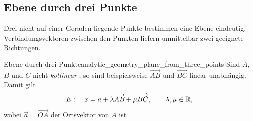 \subsection{Ebene durch drei Punkte}
\label{subsec:analytic_geometry_plane_through_three_points}

Drei nicht auf einer Geraden liegende Punkte bestimmen eine Ebene eindeutig.
Verbindungsvektoren zwischen den Punkten liefern unmittelbar zwei geeignete
Richtungen.

\begin{TheoremBox}{Ebene durch drei Punkte}{analytic_geometry_plane_from_three_points}
  Sind $A$, $B$ und $C$ nicht \emph{kollinear} , so sind beispielsweise
  $\overrightarrow{AB}$ und $\overrightarrow{BC}$ linear unabhängig. Damit
  gilt
  \[
    E:\quad
    \vec x=\vec a
    +\lambda\overrightarrow{AB}
    +\mu\overrightarrow{BC},
    \qquad \lambda,\mu\in\mathbb{R},
  \]
  wobei $\vec a=\overrightarrow{OA}$ der Ortsvektor von $A$ ist.
\end{TheoremBox}

\begin{center}
\end{center}

